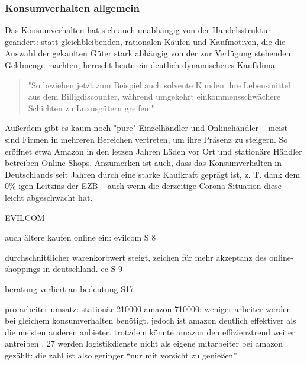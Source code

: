 \begin{folding} \subsubsection{Konsumverhalten allgemein}

Das Konsumverhalten hat sich auch unabhängig von der Handelsstruktur geändert: statt gleichbleibenden, rationalen Käufen und Kaufmotiven, die die Auswahl der gekauften Güter stark abhängig von der zur Verfügung stehenden Geldmenge machten\cite[S. 38]{Schramm}; herrscht heute ein deutlich dynamischeres Kaufklima:
\begin{quote}
"So beziehen jetzt zum Beispiel auch solvente Kunden ihre Lebensmittel aus dem Billigdiscounter, während  umgekehrt  einkommensschwächere  Schichten  zu  Luxusgütern  greifen."\cite[S. 43]{Nitt}
\end{quote}
Außerdem gibt es kaum noch "pure" Einzelhändler und Onlinehändler – meist sind Firmen in mehreren Bereichen vertreten, um ihre Präsenz zu steigern. So eröffnet etwa Amazon in den letzen Jahren Läden vor Ort und stationäre Händler betreiben Online-Shops\cite[S. 50]{Graf}.
Anzumerken ist auch, dass das Konsumverhalten in Deutschlands seit Jahren durch eine starke Kaufkraft geprägt ist, z. T. dank dem 0\%-igen Leitzins der \ac{EZB}\cite[S. 49]{Ebert} – auch wenn die derzeitige Corona-Situation diese leicht abgeschwächt hat\cite{BfWE}. 

\end{folding}



\iffalse 

        EVILCOM --------------------------------------------------------------
        
        auch ältere kaufen online ein: evilcom S 8
        
        durchschnittlicher warenkorbwert steigt, zeichen für mehr akzeptanz des online-shoppings in deutschland. ec S 9
        
        beratung verliert an bedeutung S17
        
        pro-arbeiter-umsatz: stationär 210000 amazon 710000: weniger arbeiter werden bei gleichem konsumverhalten benötigt. jedoch ist amazon deutlich effektiver als die meisten anderen anbieter. trotzdem könnte amazon den effizienztrend weiter antreiben \s. 27 werden logistikdienste nicht als eigene mitarbeiter bei amazon gezählt: die zahl ist also geringer ``nur mit vorsicht zu genießen''
        
